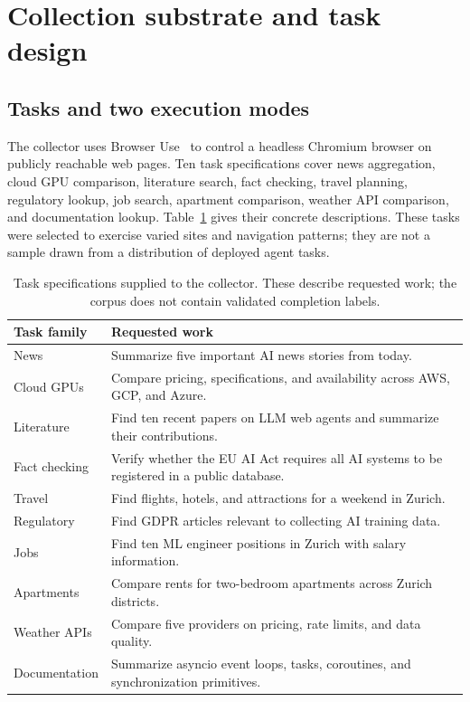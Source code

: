 \documentclass[10pt,sigconf,nonacm]{acmart}
\begin{document}
\section{Collection substrate and task design}
\label{sec:collection}
\subsection{Tasks and two execution modes}
The collector uses Browser Use~\cite{browseruse} to control a headless Chromium browser on publicly reachable web pages. Ten task specifications cover news aggregation, cloud GPU comparison, literature search, fact checking, travel planning, regulatory lookup, job search, apartment comparison, weather API comparison, and documentation lookup. Table~\ref{tab:tasks} gives their concrete descriptions. These tasks were selected to exercise varied sites and navigation patterns; they are not a sample drawn from a distribution of deployed agent tasks.

\begin{table}[t]
\centering\small
\caption{Task specifications supplied to the collector. These describe requested work; the corpus does not contain validated completion labels.}
\label{tab:tasks}
\begin{tabular}{@{}p{}p{}@{}}
\toprule
Task family & Requested work \\
\midrule
News & Summarize five important AI news stories from today. \\
Cloud GPUs & Compare pricing, specifications, and availability across AWS, GCP, and Azure. \\
Literature & Find ten recent papers on LLM web agents and summarize their contributions. \\
Fact checking & Verify whether the EU AI Act requires all AI systems to be registered in a public database. \\
Travel & Find flights, hotels, and attractions for a weekend in Zurich. \\
Regulatory & Find GDPR articles relevant to collecting AI training data. \\
Jobs & Find ten ML engineer positions in Zurich with salary information. \\
Apartments & Compare rents for two-bedroom apartments across Zurich districts. \\
Weather APIs & Compare five providers on pricing, rate limits, and data quality. \\
Documentation & Summarize asyncio event loops, tasks, coroutines, and synchronization primitives. \\
\bottomrule
\end{tabular}
\end{table}
\end{document}

